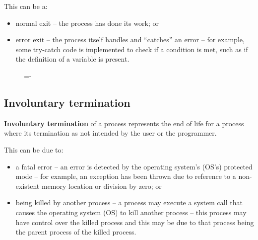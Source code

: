 \documentclass[a4paper]{systems-software}
\begin{document}
This can be a:
\begin{itemize}
	\item normal exit -- the process has done its work; or
	\item error exit -- the process itself handles and “catches” an error – for example, some try-catch code is implemented to check if a condition is met, such as if the definition of a variable is present.
\end{itemize}

\begin{figure}[H]
  \lineskip=-\fboxrule
\end{figure}


\subsection*{Involuntary termination}

\textbf{Involuntary termination} of a process represents the end of life for a process where its termination as not intended by the user or the programmer.

This can be due to:
\begin{itemize}
	\item a fatal error -- an error is detected by the operating system’s (OS’s) protected mode – for example, an exception has been thrown due to reference to a non-existent memory location or division by zero; or
	\item being killed by another process -- a process may execute a system call that causes the operating system (OS) to kill another process – this process may have control over the killed process and this may be due to that process being the parent process of the killed process.
\end{itemize}
\end{document}
